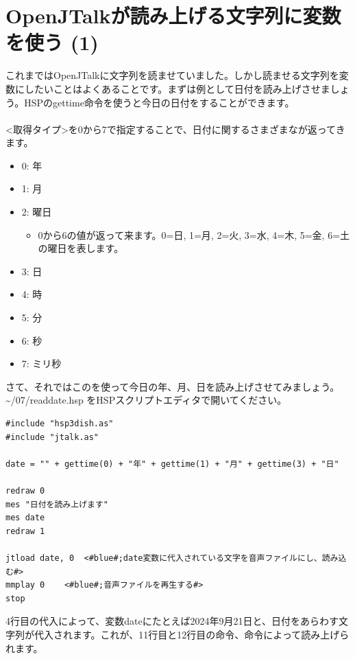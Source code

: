 \documentclass[text06.tex]{subfiles}
\begin{document}
\newpage
\section{OpenJTalkが読み上げる文字列に変数を使う (1)}
これまではOpenJTalkに文字列を読ませていました。しかし読ませる文字列を変数にしたいことはよくあることです。まずは例として日付を読み上げさせましょう。HSPのgettime命令を使うと今日の日付をすることができます。\\
\\
<取得タイプ>を0から7で指定することで、日付に関するさまざまなが返ってきます。
\begin{itemize}
\item 0: 年
\item 1: 月
\item 2: 曜日
\begin{itemize}
 \item 0から6の値が返って来ます。0=日, 1=月, 2=火, 3=水, 4=木, 5=金, 6=土 の曜日を表します。
\end{itemize}
\item 3: 日
\item 4: 時
\item 5: 分
\item 6: 秒
\item 7: ミリ秒
\end{itemize}
さて、それではこのを使って今日の年、月、日を読み上げさせてみましょう。 \textasciitilde /07/readdate.hsp をHSPスクリプトエディタで開いてください。\\

\begin{lstlisting}[caption=readdate.hsp,label=readdate.hsp]
#include "hsp3dish.as"
#include "jtalk.as"

date = "" + gettime(0) + "年" + gettime(1) + "月" + gettime(3) + "日"

redraw 0
mes "日付を読み上げます"
mes date
redraw 1

jtload date, 0	<#blue#;date変数に代入されている文字を音声ファイルにし、読み込む#>
mmplay 0	<#blue#;音声ファイルを再生する#>
stop
\end{lstlisting}

4行目の代入によって、変数dateにたとえば2024年9月21日と、日付をあらわす文字列が代入されます。これが、11行目と12行目の命令、命令によって読み上げられます。\\

\begin{tcolorbox}[title=\useOmetoi]
\begin{enumerate}
\end{enumerate}
\end{tcolorbox}
\end{document}

